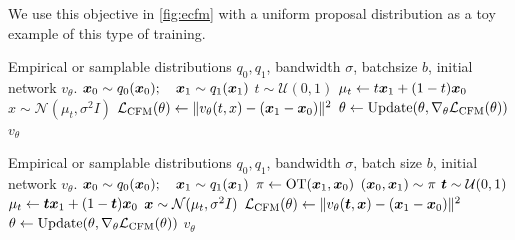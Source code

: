 \documentclass[10pt]{article}
\theoremstyle{plain}
\theoremstyle{definition}
\theoremstyle{remark}
\newcommand{\LCFM}[0]{\gL_{\rm CFM}}
\begin{document}
We use this objective in \autoref{fig:ecfm} with a uniform proposal distribution as a toy example of this type of training.

\begin{algorithm}[t]
  \caption{Simplified Conditional Flow Matching (I-CFM)}
  \label{alg:scfm}
\begin{algorithmic}
 Empirical or samplable distributions $q_0,q_1$, bandwidth $\sigma$, batchsize $b$, initial network $v_{\theta}$.
\State ${\bm{x}}_0 \sim q_0({\bm{x}}_0); \quad {\bm{x}}_1 \sim q_1({\bm{x}}_1)$
\State $t \sim \mathcal{U}(0, 1)$
\State $\mu_t \gets t {\bm{x}}_1 + (1 - t) {\bm{x}}_0$
\State $x \sim \mathcal{N}(\mu_t, \sigma^2 I)$
\State $\LCFM(\theta) \gets \| v_\theta(t, x) - (\vx_1 - \vx_0)\|^2$
\State $\theta \gets \mathrm{Update}(\theta, \nabla_\theta \LCFM(\theta))$
\EndWhile
\State \Return $v_\theta$
\end{algorithmic}
\end{algorithm}

\begin{algorithm}[t]
  \caption{Minibatch OT Conditional Flow Matching (OT-CFM)}
  \label{alg:mbotcfm}
\begin{algorithmic}
 Empirical or samplable distributions $q_0,q_1$, bandwidth $\sigma$, batch size $b$, initial network $v_{\theta}$.
\State ${\bm{x}}_0 \sim q_0({\bm{x}}_0); \quad {\bm{x}}_1 \sim q_1({\bm{x}}_1)$
\State $\pi \gets \mathrm{OT}({\bm{x}}_1, {\bm{x}}_0)$
\State $({\bm{x}}_0, {\bm{x}}_1) \sim \pi$
\State ${\bm{t}} \sim \mathcal{U}(0, 1)$
\State $\mu_t \gets {\bm{t}} {\bm{x}}_1 + (1 - {\bm{t}}) {\bm{x}}_0$
\State ${\bm{x}} \sim \mathcal{N}(\mu_t, \sigma^2 I)$
\State $\LCFM(\theta) \gets \| v_\theta(\vt, \vx) - (\vx_1 - \vx_0)\|^2$
\State $\theta \gets \mathrm{Update}(\theta, \nabla_\theta \LCFM(\theta))$
\EndWhile
\State \Return $v_\theta$
\end{algorithmic}
\end{algorithm}
\end{document}
